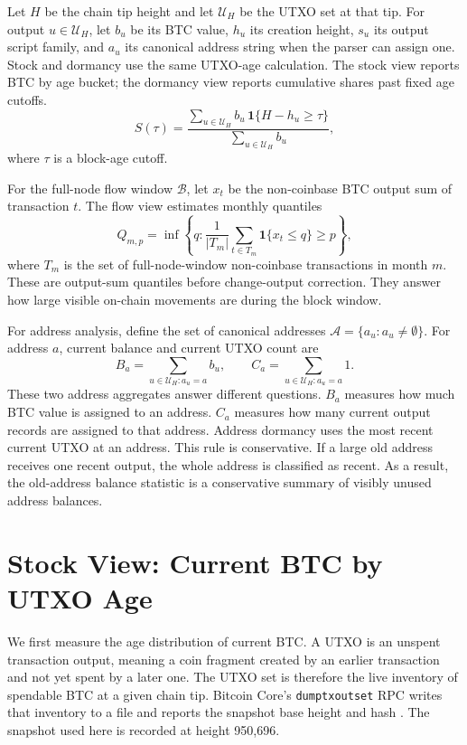 \documentclass[conference]{IEEEtran}
\begin{document}
Let $H$ be the chain tip height and let $\mathcal{U}_H$ be the UTXO set at
that tip. For output $u\in\mathcal{U}_H$, let $b_u$ be its BTC value,
$h_u$ its creation height, $s_u$ its output script family, and $a_u$ its
canonical address string when the parser can assign one. Stock and dormancy
use the same UTXO-age calculation. The stock view reports BTC by age
bucket; the dormancy view reports cumulative shares past fixed age cutoffs.
\begin{equation}
  S(\tau)=\frac{\sum_{u\in\mathcal{U}_H} b_u\,\mathbf{1}\{H-h_u\ge \tau\}}
                {\sum_{u\in\mathcal{U}_H} b_u},
\end{equation}
where $\tau$ is a block-age cutoff.

For the full-node flow window $\mathcal{B}$, let $x_t$ be the non-coinbase
BTC output sum of transaction $t$. The flow view estimates monthly
quantiles
\begin{equation}
  Q_{m,p}=\inf\left\{q: \frac{1}{|T_m|}\sum_{t\in T_m}
  \mathbf{1}\{x_t\le q\}\ge p\right\},
\end{equation}
where $T_m$ is the set of full-node-window non-coinbase transactions in
month $m$. These are output-sum quantiles before change-output correction.
They answer how large visible on-chain movements are during the block
window.

For address analysis, define the set of canonical addresses
$\mathcal{A}=\{a_u: a_u\neq \emptyset\}$. For address $a$, current balance
and current UTXO count are
\begin{equation}
  B_a=\sum_{u\in\mathcal{U}_H:a_u=a} b_u,\qquad
  C_a=\sum_{u\in\mathcal{U}_H:a_u=a} 1.
\end{equation}
These two address aggregates answer different questions. $B_a$ measures
how much BTC value is assigned to an address. $C_a$ measures how many
current output records are assigned to that address. Address dormancy uses
the most recent current UTXO at an address. This rule is conservative. If a
large old address receives one recent output, the whole address is
classified as recent. As a result, the old-address balance statistic is a
conservative summary of visibly unused address balances.

\section{Stock View: Current BTC by UTXO Age}\label{sec:stock}

We first measure the age distribution of current BTC. A UTXO is an unspent
transaction output, meaning a coin fragment created by an earlier transaction
and not yet spent by a later one. The UTXO set is therefore the live inventory
of spendable BTC at a given chain tip. Bitcoin Core's
\texttt{dumptxoutset} RPC writes that inventory to a file and reports the
snapshot base height and hash \cite{bitcoincore2026dumptxoutset}. The
snapshot used here is recorded at height 950{,}696.
\end{document}
